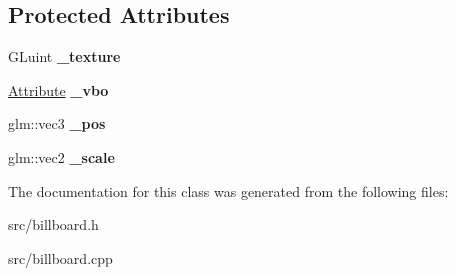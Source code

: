 \subsection*{Protected Attributes}
\begin{DoxyCompactItemize}
\item 
\hypertarget{class_billboard_aca662cbb29249fff9ce4ef70f3d4631c}{}G\+Luint {\bfseries \+\_\+texture}\label{class_billboard_aca662cbb29249fff9ce4ef70f3d4631c}

\item 
\hypertarget{class_billboard_aac80d99f04519704cf9a3dfa04283868}{}\hyperlink{class_attribute}{Attribute} {\bfseries \+\_\+vbo}\label{class_billboard_aac80d99f04519704cf9a3dfa04283868}

\item 
\hypertarget{class_billboard_a37a76361d3ff00534dce23e47cbc0051}{}glm\+::vec3 {\bfseries \+\_\+pos}\label{class_billboard_a37a76361d3ff00534dce23e47cbc0051}

\item 
\hypertarget{class_billboard_a665281e24fc18d9843b080a482d51cd0}{}glm\+::vec2 {\bfseries \+\_\+scale}\label{class_billboard_a665281e24fc18d9843b080a482d51cd0}

\end{DoxyCompactItemize}


The documentation for this class was generated from the following files\+:\begin{DoxyCompactItemize}
\item 
src/billboard.\+h\item 
src/billboard.\+cpp\end{DoxyCompactItemize}

